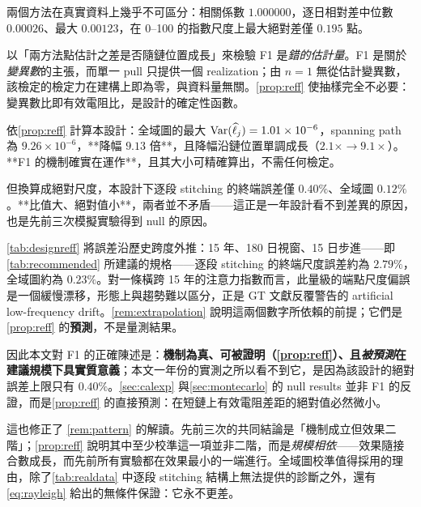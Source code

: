 \documentclass[12pt,a4paper,oneside]{article}
\begin{document}
兩個方法在真實資料上幾乎不可區分：相關係數 $1.000000$，逐日相對差中位數 $0.00026$、最大 $0.00123$，在 0--100 的指數尺度上最大絕對差僅 $0.195$ 點。

\begin{remark}[一個必須指出的方法錯誤]
\label{rem:n1}
以「兩方法點估計之差是否隨鏈位置成長」來檢驗 F1 是\emph{錯的估計量}。F1 是關於\emph{變異數}的主張，而單一 pull 只提供一個 realization；由 $n=1$ 無從估計變異數，該檢定的檢定力在建構上即為零，與資料量無關。\cref{prop:reff} 使抽樣完全不必要：變異數比即有效電阻比，是設計的確定性函數。
\end{remark}

依\cref{prop:reff} 計算本設計：全域圖的最大 $\operatorname{Var}(\widehat\ell_j)=1.01\times10^{-6}$，spanning path 為 $9.26\times10^{-6}$，**降幅 $9.13$ 倍**，且降幅沿鏈位置單調成長（$2.1\times\to9.1\times$）。**F1 的機制確實在運作**，且其大小可精確算出，不需任何檢定。

但換算成絕對尺度，本設計下逐段 stitching 的終端誤差僅 $0.40\%$、全域圖 $0.12\%$。**比值大、絕對值小**，兩者並不矛盾——這正是一年設計看不到差異的原因，也是先前三次模擬實驗得到 null 的原因。

\begin{remark}
\label{rem:f1scale}
\cref{tab:designreff} 將誤差沿歷史跨度外推：15 年、180 日視窗、15 日步進——即\cref{tab:recommended} 所建議的規格——逐段 stitching 的終端尺度誤差約為 $2.79\%$，全域圖約為 $0.23\%$。對一條橫跨 15 年的注意力指數而言，此量級的端點尺度偏誤是一個緩慢漂移，形態上與趨勢難以區分，正是 GT 文獻反覆警告的 artificial low-frequency drift。\cref{rem:extrapolation} 說明這兩個數字所依賴的前提；它們是\cref{prop:reff} 的\textbf{預測}，不是量測結果。

因此本文對 F1 的正確陳述是：\textbf{機制為真、可被證明（\cref{prop:reff}）、且\emph{被預測}在建議規模下具實質意義}；本文一年份的實測之所以看不到它，是因為該設計的絕對誤差上限只有 $0.40\%$。\cref{sec:calexp} 與\cref{sec:montecarlo} 的 null results 並非 F1 的反證，而是\cref{prop:reff} 的直接預測：在短鏈上有效電阻差距的絕對值必然微小。

這也修正了 \cref{rem:pattern} 的解讀。先前三次的共同結論是「機制成立但效果二階」；\cref{prop:reff} 說明其中至少校準這一項並非二階，而是\emph{規模相依}——效果隨接合數成長，而先前所有實驗都在效果最小的一端進行。全域圖校準值得採用的理由，除了\cref{tab:realdata} 中逐段 stitching 結構上無法提供的診斷之外，還有\cref{eq:rayleigh} 給出的無條件保證：它永不更差。
\end{remark}
\end{document}
